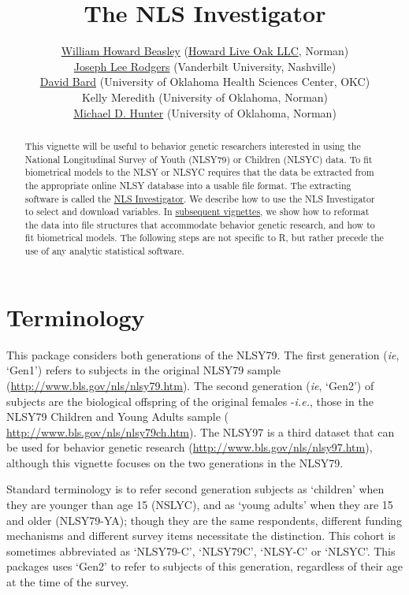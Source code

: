 \documentclass{article}\usepackage[]{graphicx}\usepackage[]{color}
\title{The NLS Investigator}
\author{\href{http://scholar.google.com/citations?user=ffsJTC0AAAAJ}{William Howard Beasley} (\href{http://howardliveoak.com/}{Howard Live Oak LLC}, Norman)\\
\href{http://www.vanderbilt.edu/psychological_sciences/bio/joe-rodgers}{Joseph Lee Rodgers} (Vanderbilt University, Nashville)\\
\href{http://find.ouhsc.edu/Faculty.aspx?FacultyID=1041}{David Bard} (University of Oklahoma Health Sciences Center, OKC)\\
Kelly Meredith (University of Oklahoma, Norman)\\
\href{http://students.ou.edu/H/Michael.D.Hunter-1/}{Michael D. Hunter} (University of Oklahoma, Norman)
}
\begin{document}
\newcommand{\code}[1]{\texttt{\small{#1}}}
\newcommand{\pkg}[1]{\textsf{\small{#1}}}
\let\proglang=\textsf
\newcommand{\R}{\proglang{R}} %

\maketitle
\tableofcontents

\begin{abstract}
This vignette will be useful to behavior genetic researchers interested in using the National Longitudinal Survey of Youth (NLSY79) or Children (NLSYC) data.  To fit biometrical models to the NLSY or NLSYC requires that the data be extracted from the appropriate online NLSY database into a usable file format.  The extracting software is called the \href{https://www.nlsinfo.org/investigator/pages/login.jsp}{NLS Investigator}.  We describe how to use the NLS Investigator to select and download variables.   In \href{http://cran.r-project.org/web/packages/NlsyLinks/}{subsequent vignettes}, we show how to reformat the data into file structures that accommodate behavior genetic research, and how to fit biometrical models.  The following steps are not specific to \R{}, but rather precede the use of any analytic statistical software.
\end{abstract}



\section{Terminology} %
This package considers both generations of the NLSY79.  The first generation (\emph{ie}, `Gen1') refers to subjects in the original NLSY79 sample (\url{http://www.bls.gov/nls/nlsy79.htm}).  The second generation (\emph{ie}, `Gen2') of subjects are the biological offspring of the original females -\emph{i.e.}, those in the NLSY79 Children and Young Adults sample ( \url{http://www.bls.gov/nls/nlsy79ch.htm}).  The NLSY97 is a third dataset that can be used for behavior genetic research (\url{http://www.bls.gov/nls/nlsy97.htm}), although this vignette focuses on the two generations in the NLSY79.

Standard terminology is to refer second generation subjects as `children' when they are younger than age 15 (NSLYC), and as `young adults' when they are 15 and older (NLSY79-YA); though they are the same respondents, different funding mechanisms and different survey items necessitate the distinction.  This cohort is sometimes abbreviated as `NLSY79-C', `NLSY79C', `NLSY-C' or `NLSYC'. This packages uses `Gen2' to refer to subjects of this generation, regardless of their age at the time of the survey.
\end{document}
